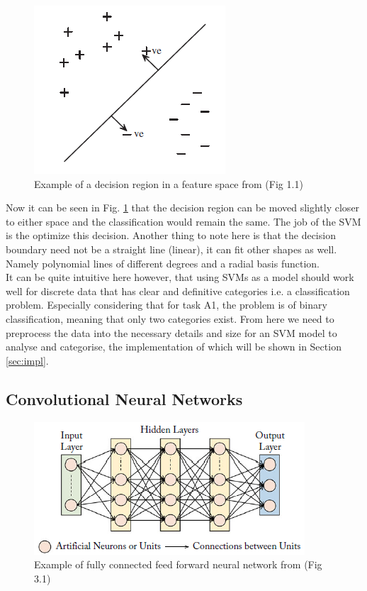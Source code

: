 \documentclass{article}
\begin{document}
    \begin{figure}[htb]
    	\centering
    	\includegraphics[scale=0.7]{Figures/Example_SVM.PNG}
    	\caption{Example of a decision region in a feature space from \cite{6812816} (Fig 1.1)}
    	\label{fig:example_svm}
    \end{figure}

    Now it can be seen in Fig. \ref{fig:example_svm} that the decision region can be moved slightly closer to either space and the classification would remain the same. The job of the SVM is the optimize this decision. Another thing to note here is that the decision boundary need not be a straight line (linear), it can fit other shapes as well. Namely polynomial lines of different degrees and a radial basis function. \\
    
    It can be quite intuitive here however, that using SVMs as a model should work well for discrete data that has clear and definitive categories i.e. a classification problem. Especially considering that for task A1, the problem is of binary classification, meaning that only two categories exist. From here we need to preprocess the data into the necessary details and size for an SVM model to analyse and categorise, the implementation of which will be shown in Section \ref{sec:impl}.
    
    \subsection{Convolutional Neural Networks}
    \begin{figure}[htb]
    	\centering
    	\includegraphics[scale=0.7]{Figures/Example_NN.PNG}
    	\caption{Example of fully connected feed forward neural network from \cite{8295029} (Fig 3.1)}
    	\label{fig:example_nn}
    \end{figure}
    
\end{document}
